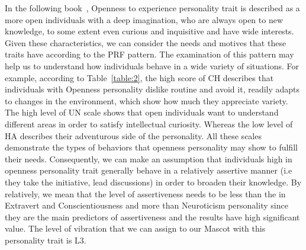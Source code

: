 In the following book~\cite{matthews2003personality}, Openness to experience
personality trait is described as a more open individuals with a deep imagination,
who are always open to new knowledge, to some extent even curious and inquisitive and have wide interests.
Given these characteristics, we can consider the needs and motives that these traits have according to the PRF pattern.
The examination of this pattern may help us to understand how individuals behave in a wide variety of situations.
For example, according to Table~\ref{table:2}, the high score of CH describes that
individuals with Openness personality dislike routine and avoid it, readily adapts to changes
in the environment, which show how much they appreciate variety.
The high level of UN scale shows that open individuals want to understand
different areas in order to satisfy intellectual curiosity.
Whereas the low level of HA describes their adventurous side of the personality.
All these scales demonstrate the types of behaviors that openness personality may show to fulfill their needs.
Consequently, we can make an assumption that individuals high in openness
personality trait generally behave in a relatively assertive manner
(i.e they take the initiative, lead discussions) in order to broaden their knowledge.
By relatively, we mean that the level of assertiveness needs to be less than the in
Extravert and Conscientiousness and more than Neuroticism personality since they are the
main predictors of assertiveness and the results have high significant value.
The level of vibration that we can assign to our Mascot with this personality trait is L3. 
 

